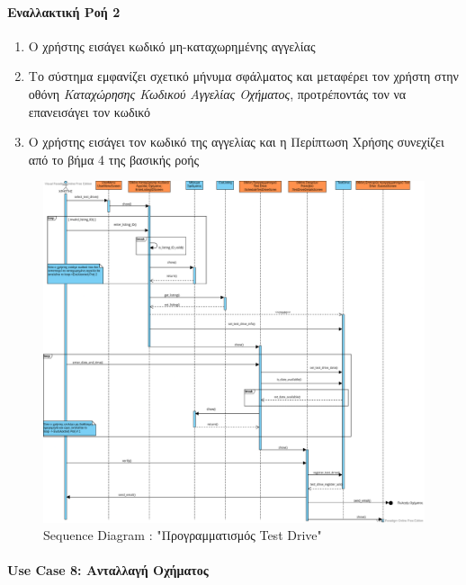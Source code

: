 \documentclass{../ol-softwaremanual}
\begin{document}
	
	\paragraph{Εναλλακτική Ροή 2}
	
	\begin{enumerate}
		\item Ο χρήστης εισάγει κωδικό μη-καταχωρημένης αγγελίας
		\item Το σύστημα εμφανίζει σχετικό μήνυμα σφάλματος και μεταφέρει τον χρήστη στην οθόνη \textit{Καταχώρησης Κωδικού Αγγελίας Οχήματος}, προτρέποντάς τον να επανεισάγει τον κωδικό
		\item Ο χρήστης εισάγει τον κωδικό της αγγελίας και η Περίπτωση Χρήσης συνεχίζει από το βήμα 4 της βασικής ροής
	\end{enumerate}
	
	\begin{figure}[htbp!]
		\centering
		\includegraphics[scale=0.32]{img/seq_test_drive.png}
		\caption{\en Sequence Diagram : "\gr Προγραμματισμός \en Test Drive"\gr}
	\end{figure}
	
	\newpage
	\centering
	
	\paragraph{\en Use Case 8: \gr  Ανταλλαγή Οχήματος \gr}
	
\end{document}
